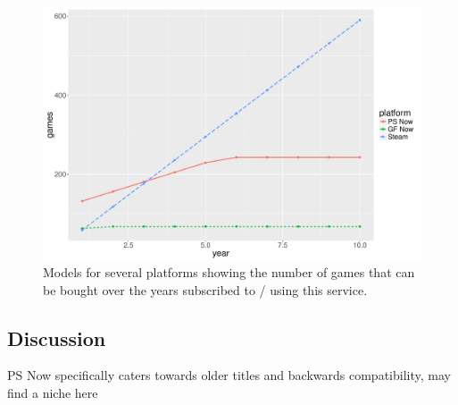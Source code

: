 \begin{figure}[!t]
	\centering
	\includegraphics[width=1.0\columnwidth]{images/games-over-year.pdf}
	\caption{Models for several platforms showing the number of games that can be bought over the years subscribed to / using this service.}
\label{fig:games-over-years}
\end{figure}


\subsection{Discussion}

PS Now specifically caters towards older titles and backwards compatibility, may find a niche here












